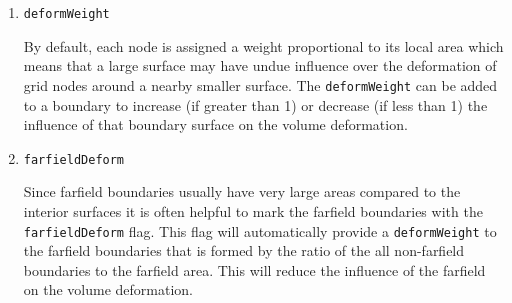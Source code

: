 \begin{enumerate}
  \item {\tt deformWeight}
    
    By default, each node is assigned a weight proportional to its
    local area which means that a large surface may have undue
    influence over the deformation of grid nodes around a nearby
    smaller surface.  The {\tt deformWeight} can be added to a
    boundary to increase (if greater than 1) or decrease (if less than
    1) the influence of that boundary surface on the volume
    deformation.

  \item {\tt farfieldDeform}

    Since farfield boundaries usually have very large areas compared
    to the interior surfaces it is often helpful to mark the farfield
    boundaries with the {\tt farfieldDeform} flag.  This flag will
    automatically provide a {\tt deformWeight} to the farfield
    boundaries that is formed by the ratio of the all non-farfield
    boundaries to the farfield area.  This will reduce the influence
    of the farfield on the volume deformation.

\end{enumerate}
